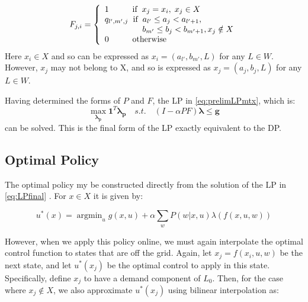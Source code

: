 \documentclass[conference]{IEEEtran}
\DeclareMathOperator*{\argmin}{argmin}
\begin{document}
\begin{displaymath}
F_{j,i}=
\left\{
\begin{array}{l}
1		   \hspace{1cm} \text{if} \hspace{0.2cm}x_{j}=x_{i}, \hspace{0.1cm}x_{j}\in X\\
q_{l',m',j}\hspace{0.2cm} \text{if} \hspace{0.2cm} a_{l'}\leq a_{j}< a_{l'+1},\\
\hspace{1.6cm} b_{m'}\leq b_{j}< b_{m'+1}, x_{j}\notin X\\
0		   \hspace{1cm} \text{otherwise}
\end{array}
\right.
\end{displaymath} Here $x_{i}\in X$ and so can be expressed as $x_{i}=(a_{l'},b_{m'},L)$ for any $L\in W$. However, $x_{j}$ may not belong to X, and so is expressed as $x_{j}=(a_{j},b_{j},L)$ for any $L\in W$.

Having determined the forms of $P$ and $F$, the LP in \eqref{eq:prelimLPmtx}, which is:
\begin{equation} \label{eq:LPfinal}
    \max_{\boldsymbol{\lambda_{p}}} \boldsymbol{1}^{T} \boldsymbol{\lambda_{p}}
    \hspace{1em}s.t.\hspace{1em}
    (I-\alpha PF)\boldsymbol{\lambda} \leq \boldsymbol{g}
\end{equation} can be solved. This is the final form of the LP exactly equivalent to the DP. 


\subsection{Optimal Policy}
The optimal policy my be constructed directly from the solution of the LP in \eqref{eq:LPfinal} \cite{Bertsekas:2007:DPO:1396348}. For $x\in X$ it is given by:

\begin{equation}
    u^{*}(x)=\argmin_{u} g(x,u)+\alpha \sum_{w} P(w|x,u)\lambda(f(x,u,w))
\end{equation}

However, when we apply this policy online, we must again interpolate the optimal control function to states that are off the grid. Again, let $x_{j}=f(x_{i}, u, w)$ be the next state, and let $u^{*}(x_{j})$ be the optimal control to apply in this state. Specifically, define $x_{j}$ to have a demand component of $L_{0}$. Then, for the case where $x_{j}\not\in X$, we also approximate $u^{*}(x_{j})$ using bilinear interpolation as:
\end{document}
